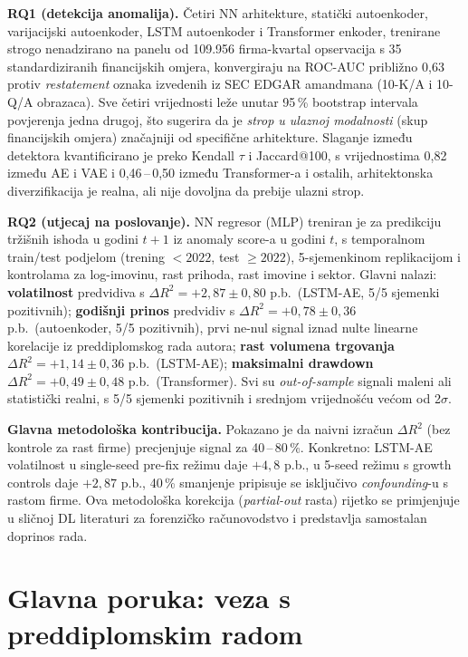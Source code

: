 \documentclass[diplomskirad,authoryear]{fer}
\begin{document}
\textbf{RQ1 (detekcija anomalija).} Četiri NN arhitekture, statički autoenkoder, varijacijski autoenkoder, LSTM autoenkoder i Transformer enkoder, trenirane strogo nenadzirano na panelu od 109.956 firma-kvartal opservacija s 35 standardiziranih financijskih omjera, konvergiraju na ROC-AUC približno 0,63 protiv \emph{restatement} oznaka izvedenih iz SEC EDGAR amandmana (10-K/A i 10-Q/A obrazaca). Sve četiri vrijednosti leže unutar 95\,\% bootstrap intervala povjerenja jedna drugoj, što sugerira da je \emph{strop u ulaznoj modalnosti} (skup financijskih omjera) značajniji od specifične arhitekture. Slaganje između detektora kvantificirano je preko Kendall $\tau$ i Jaccard@100, s vrijednostima 0,82 između AE i VAE i 0,46\,--\,0,50 između Transformer-a i ostalih, arhitektonska diverzifikacija je realna, ali nije dovoljna da prebije ulazni strop.

\textbf{RQ2 (utjecaj na poslovanje).} NN regresor (MLP) treniran je za predikciju tržišnih ishoda u godini $t+1$ iz anomaly score-a u godini $t$, s temporalnom train/test podjelom (trening $<2022$, test $\geq 2022$), 5-sjemenkinom replikacijom i kontrolama za log-imovinu, rast prihoda, rast imovine i sektor. Glavni nalazi: \textbf{volatilnost} predvidiva s $\Delta R^2 = +2{,}87 \pm 0{,}80$ p.b.\ (LSTM-AE, 5/5 sjemenki pozitivnih); \textbf{godišnji prinos} predvidiv s $\Delta R^2 = +0{,}78 \pm 0{,}36$ p.b.\ (autoenkoder, 5/5 pozitivnih), prvi ne-nul signal iznad nulte linearne korelacije iz preddiplomskog rada autora; \textbf{rast volumena trgovanja} $\Delta R^2 = +1{,}14 \pm 0{,}36$ p.b.\ (LSTM-AE); \textbf{maksimalni drawdown} $\Delta R^2 = +0{,}49 \pm 0{,}48$ p.b.\ (Transformer). Svi su \emph{out-of-sample} signali maleni ali statistički realni, s 5/5 sjemenki pozitivnih i srednjom vrijednošću većom od 2$\sigma$.

\textbf{Glavna metodološka kontribucija.} Pokazano je da naivni izračun $\Delta R^2$ (bez kontrole za rast firme) precjenjuje signal za 40\,--\,80\,\%. Konkretno: LSTM-AE volatilnost u single-seed pre-fix režimu daje $+4{,}8$ p.b., u 5-seed režimu s growth controls daje $+2{,}87$ p.b., 40\,\% smanjenje pripisuje se isključivo \emph{confounding}-u s rastom firme. Ova metodološka korekcija (\emph{partial-out} rasta) rijetko se primjenjuje u sličnoj DL literaturi za forenzičko računovodstvo i predstavlja samostalan doprinos rada.

\section{Glavna poruka: veza s preddiplomskim radom}
\end{document}
